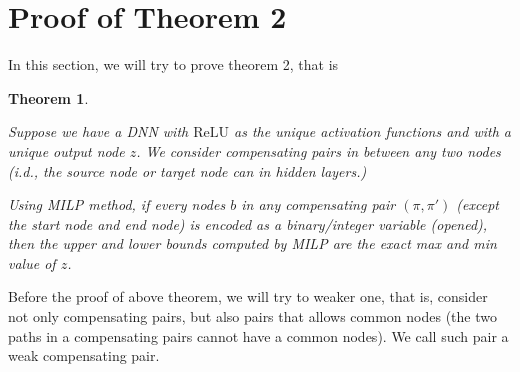 \documentclass[]{article}
\newtheorem{theorem}{Theorem}
\theoremstyle{definition}
\newcommand{\ReLU}{\mathrm{ReLU}}
\begin{document}
			
			
			\section{Proof of Theorem 2}
			
			In this section, we will try to prove theorem 2, that is 
			
			\begin{theorem}
				\label{no_diamond_3}
				
				Suppose we have a DNN with $\ReLU$ as the unique activation functions and with a unique output node $z$. We consider compensating pairs in between any two nodes (i.d., the source node or target node can in hidden layers.)
				
				Using MILP method, if every nodes $b$ in any compensating pair
				$(\pi,\pi')$ (except the start node and end node) is encoded as a binary/integer variable (opened), then the upper and lower 
				bounds computed by MILP are the exact max and min value of $z$.
			\end{theorem}
			
			
			Before the proof of above theorem, we will try to weaker one, that is, consider not only compensating pairs, but also pairs that allows common nodes (the two paths in a compensating pairs cannot have a common nodes). We call such pair a weak compensating pair.
			
\end{document}
